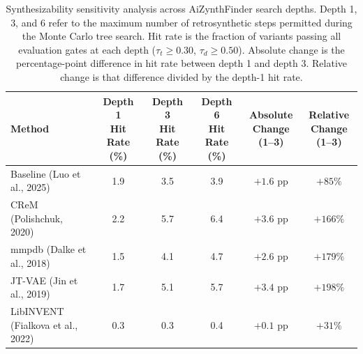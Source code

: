 \begin{table}[ht]
\centering
\caption{Synthesizability sensitivity analysis across AiZynthFinder search
depths. Depth 1, 3, and 6 refer to the maximum number of retrosynthetic steps
permitted during the Monte Carlo tree search. Hit rate is the fraction of
variants passing all evaluation gates at each depth ($\tau_t \geq 0.30$,
$\tau_d \geq 0.50$). Absolute change is the percentage-point difference in
hit rate between depth 1 and depth 3. Relative change is that difference
divided by the depth-1 hit rate.}
\label{tab:synthesizability-sensitivity}
\begin{tabular}{lccccc}
\toprule
Method
  & \makecell{Depth 1 \\ Hit Rate (\%)}
  & \makecell{Depth 3 \\ Hit Rate (\%)}
  & \makecell{Depth 6 \\ Hit Rate (\%)}
  & \makecell{Absolute \\ Change (1--3)}
  & \makecell{Relative \\ Change (1--3)} \\
\midrule
Baseline (Luo et al., 2025)        & 1.9 & 3.5 & 3.9 & $+1.6$ pp & $+85\%$  \\
CReM (Polishchuk, 2020)            & 2.2 & 5.7 & 6.4 & $+3.6$ pp & $+166\%$ \\
mmpdb (Dalke et al., 2018)         & 1.5 & 4.1 & 4.7 & $+2.6$ pp & $+179\%$ \\
JT-VAE (Jin et al., 2019)          & 1.7 & 5.1 & 5.7 & $+3.4$ pp & $+198\%$ \\
LibINVENT (Fialkova et al., 2022)  & 0.3 & 0.3 & 0.4 & $+0.1$ pp & $+31\%$  \\
\bottomrule
\end{tabular}
\end{table}
